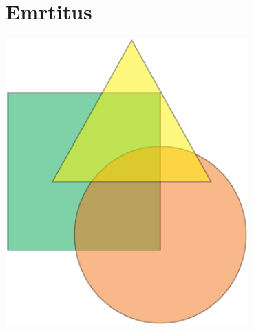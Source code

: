 \section*{Emrtitus}
 
 \begin{minipage}[t]{\textwidth}
	\begingroup
	\parfillskip=0pt
	
  	\begin{minipage}[t]{0.25\textwidth}	
   		\centering
		\includegraphics[width=0.7\textwidth]{Bilder/Grafik}		
  	\end{minipage}	
 	\hfill 	
  	\begin{minipage}[c]{0.7\textwidth}
  		\blindtext
  	\end{minipage}  
	\par\endgroup
\end{minipage}



